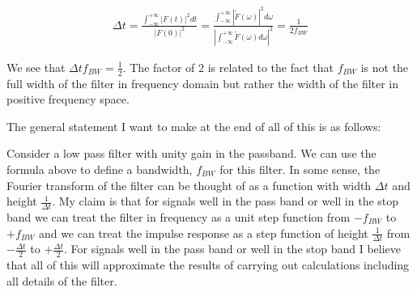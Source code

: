 \documentclass[12pt]{article}
\begin{document}
\begin{align}
\Delta t = \frac{\int_{-\infty}^{+\infty} |F(t)|^2 dt}{|F(0)|^2} = \frac{\int_{-\infty}^{+\infty} |\tilde{F}(\omega)|^2 d\omega}{\left|\int_{-\infty}^{+\infty} \tilde{F}(\omega) d\omega\right|^2} = \frac{1}{2f_{BW}}
\end{align}

We see that $\Delta t f_{BW} = \frac{1}{2}$. The factor of 2 is related to the fact that $f_{BW}$ is not the full width of the filter in frequency domain but rather the width of the filter in positive frequency space.

The general statement I want to make at the end of all of this is as follows:

Consider a low pass filter with unity gain in the passband. We can use the formula above to define a bandwidth, $f_{BW}$ for this filter. In some sense, the Fourier transform of the filter can be thought of as a function with width $\Delta t$ and height $\frac{1}{\Delta t}$. My claim is that for signals well in the pass band or well in the stop band we can treat the filter in frequency as a unit step function from $-f_{BW}$ to $+f_{BW}$ and we can treat the impulse response as a step function of height $\frac{1}{\Delta t}$ from $-\frac{\Delta t}{2}$ to $+\frac{\Delta t}{2}$. For signals well in the pass band or well in the stop band I believe that all of this will approximate the results of carrying out calculations including all details of the filter.
\end{document}
